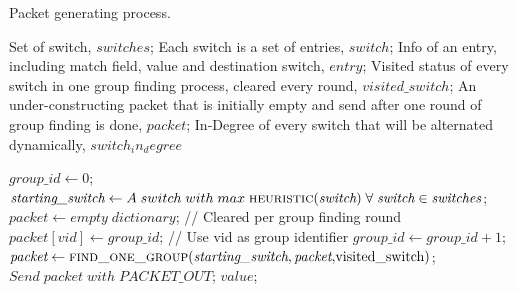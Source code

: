 \begin {tcolorbox}[blanker,float=tbp,
grow to left by=1cm, grow to right by=1cm]
\begin{algorithm}[H]

  \caption{Packet generating process.}
  \begin{algorithmic}[1]
    \Require
      Set of switch, $switches$;  \newline
      Each switch is a set of entries, $switch$;  \newline
      Info of an entry, including match field, value and destination switch, $entry$;  \newline
      Visited status of every switch in one group finding process, cleared every round, $visited\_switch$;  \newline
      An under-constructing packet that is initially empty and send after one round of group finding is done, $packet$; \newline
      In-Degree of every switch that will be alternated dynamically, $switch_in_degree$
      
      \State $\textit{group\_id} \gets 0$;
            \State $\textit{starting\_switch} \gets A\;switch\;with\;max\;\Call{heuristic}{\textit{switch}}\;\forall\;\textit{switch} \in \textit{switches}$;
            \State $\textit{packet} \gets empty\;dictionary$;   // Cleared per group finding round
            \State $packet[vid] \gets \textit{group\_id}$;   // Use vid as group identifier 
            \State $group\_id \gets \textit{group\_id} + 1$;
            \State $\textit{packet} \gets \Call{find\_one\_group}{\textit{starting\_switch}, \textit{packet},$visited\_switch$}$;
            \State $Send\;\textit{packet}\;with\;PACKET\_OUT$;
      \EndWhile
    \EndFunction
    \State
      \State \Return $value$;
    \EndFunction
    \State
  \end{algorithmic}
\end{algorithm}
\end{tcolorbox}

